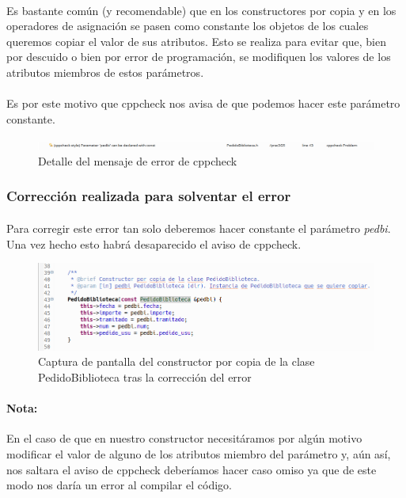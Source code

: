 		\paragraph{}Es bastante común (y recomendable) que en los constructores por copia y en los operadores de asignación se pasen como constante los objetos de los cuales queremos copiar el valor de sus atributos. Esto se realiza para evitar que, bien por descuido o bien por error de programación, se modifiquen los valores de los atributos miembros de estos parámetros.
		
		\paragraph{}Es por este motivo que cppcheck nos avisa de que podemos hacer este parámetro constante.
		
		\begin{figure}[H]
			\centering
			\includegraphics[scale=0.38]{img/captura55.png}
			\caption{Detalle del mensaje de error de cppcheck}
			\label{captura55}
		\end{figure}
	
		\subsubsection{Corrección realizada para solventar el error}
		
		\paragraph{}Para corregir este error tan solo deberemos hacer constante el parámetro \textit{pedbi}. Una vez hecho esto habrá desaparecido el aviso de cppcheck.
		
		\begin{figure}[H]
			\centering
			\includegraphics[scale=0.55]{img/captura56.png}
			\caption{Captura de pantalla del constructor por copia de la clase PedidoBiblioteca tras la corrección del error}
			\label{captura56}
		\end{figure}
		
		\paragraph{Nota:}En el caso de que en nuestro constructor necesitáramos por algún motivo modificar el valor de alguno de los atributos miembro del parámetro y, aún así, nos saltara el aviso de cppcheck deberíamos hacer caso omiso ya que de este modo nos daría un error al compilar el código.
	
\newpage